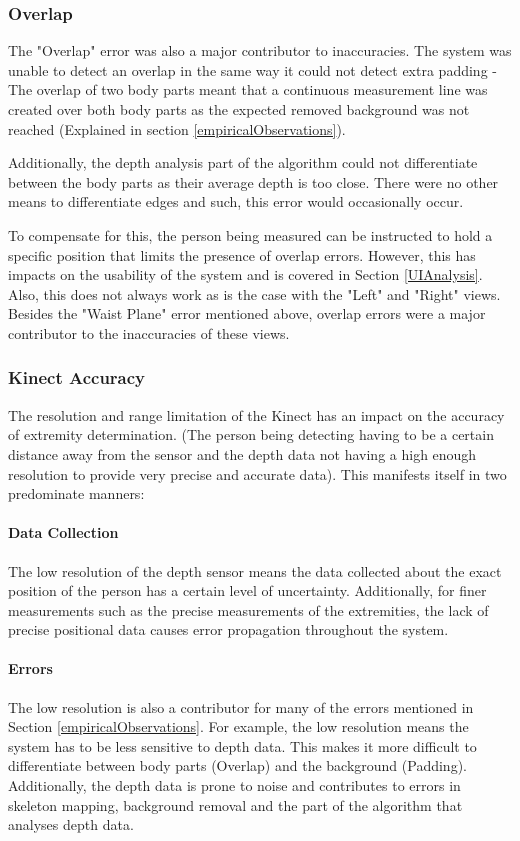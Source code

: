 \subsubsection{Overlap}
The "Overlap" error was also a major contributor to inaccuracies. The system was unable to detect an overlap in the same way it could not detect extra padding - The overlap of two body parts meant that a continuous measurement line was created over both body parts as the expected removed background was not reached (Explained in section \ref{empiricalObservations}). 

Additionally, the depth analysis part of the algorithm could not differentiate between the body parts as their average depth is too close. There were no other means to differentiate edges and such, this error would occasionally occur.

To compensate for this, the person being measured can be instructed to hold a specific position that limits the presence of overlap errors. However, this has impacts on the usability of the system and is covered in Section \ref{UIAnalysis}. Also, this does not always work as is the case with the "Left" and "Right" views. Besides the "Waist Plane" error mentioned above, overlap errors were a major contributor to the inaccuracies of these views. 

\subsubsection{Kinect Accuracy}
The resolution and range limitation of the Kinect has an impact on the accuracy of extremity determination. (The person being detecting having to be a certain distance away from the sensor and the depth data not having a high enough resolution to provide very precise and accurate data). This manifests itself in two predominate manners:

\paragraph{Data Collection} 
The low resolution of the depth sensor means the data collected about the exact position of the person has a certain level of uncertainty. Additionally, for finer measurements such as the precise measurements of the extremities, the lack of precise positional data causes error propagation throughout the system.

\paragraph{Errors}
The low resolution is also a contributor for many of the errors mentioned in Section \ref{empiricalObservations}. For example, the low resolution means the system has to be less sensitive to depth data. This makes it more difficult to differentiate between body parts (Overlap) and the background (Padding). Additionally, the depth data is prone to noise and contributes to errors in skeleton mapping, background removal and the part of the algorithm that analyses depth data. 


